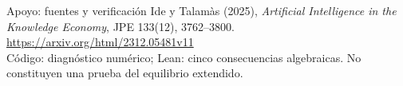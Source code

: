 \documentclass[aspectratio=169,11pt]{beamer}
\begin{document}
\begin{frame}{Apoyo: fuentes y verificación}
Ide y Talamàs (2025), \emph{Artificial Intelligence in the Knowledge Economy}, JPE 133(12), 3762--3800.\\ \url{https://arxiv.org/html/2312.05481v11}\\ Código: diagnóstico numérico; Lean: cinco consecuencias algebraicas. No constituyen una prueba del equilibrio extendido.
\end{frame}
\end{document}
